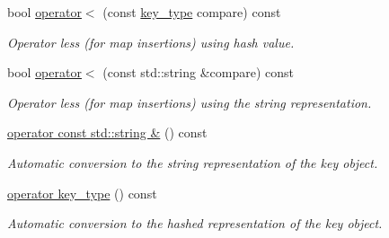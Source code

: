 \begin{DoxyCompactItemize}
bool \hyperlink{class_d_d4hep_1_1_conditions_1_1_condition_key_a5827486a4f51126bcc9f036dcafb7b57}{operator$<$} (const \hyperlink{class_d_d4hep_1_1_conditions_1_1_condition_key_a08bfc8ccb807bdd5e4d9f3b065d1c8f5}{key\_\-type} compare) const 
\begin{DoxyCompactList}\small\item\em Operator less (for map insertions) using hash value. \item\end{DoxyCompactList}\item 
bool \hyperlink{class_d_d4hep_1_1_conditions_1_1_condition_key_ab336cbe9c3bc6479aa7c282df6e29e66}{operator$<$} (const std::string \&compare) const 
\begin{DoxyCompactList}\small\item\em Operator less (for map insertions) using the string representation. \item\end{DoxyCompactList}\item 
\hyperlink{class_d_d4hep_1_1_conditions_1_1_condition_key_ae7b28eefcfb2efc278c5e3b89ee1fd51}{operator const std::string \&} () const 
\begin{DoxyCompactList}\small\item\em Automatic conversion to the string representation of the key object. \item\end{DoxyCompactList}\item 
\hyperlink{class_d_d4hep_1_1_conditions_1_1_condition_key_a4d7d45150a10b6e04db3343f9fb1ba6d}{operator key\_\-type} () const 
\begin{DoxyCompactList}\small\item\em Automatic conversion to the hashed representation of the key object. \item\end{DoxyCompactList}\end{DoxyCompactItemize}
